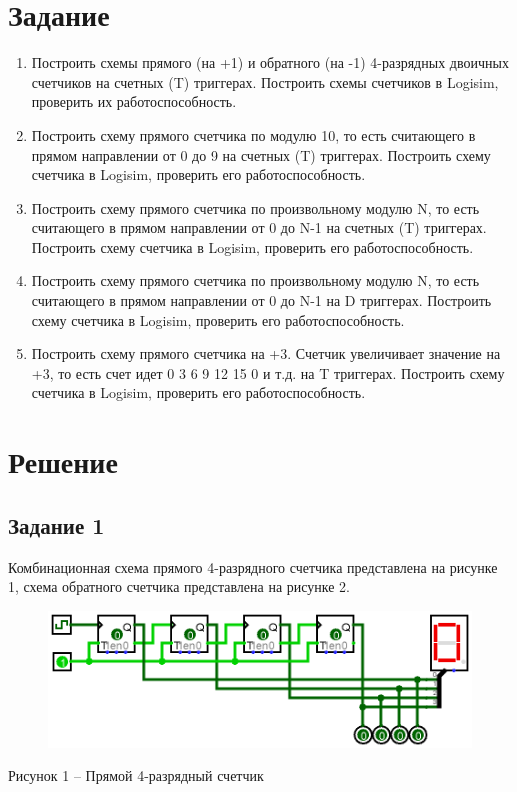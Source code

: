 \documentclass[a4paper,14pt]{extarticle}
\begin{document}
	\section*{Задание}
	\begin{enumerate}
		\item Построить схемы прямого (на +1) и обратного (на -1) 4-разрядных двоичных счетчиков на счетных (T) триггерах. Построить схемы счетчиков в Logisim, проверить их работоспособность.
		
		\item Построить схему прямого счетчика по модулю 10, то есть считающего в прямом направлении от 0 до 9 на счетных (T) триггерах. Построить схему счетчика в Logisim, проверить его работоспособность.
		
		\item Построить схему прямого счетчика по произвольному модулю N, то есть считающего в прямом направлении от 0 до N-1 на счетных (T) триггерах. Построить схему счетчика в Logisim, проверить его работоспособность.
		
		\item Построить схему прямого счетчика по произвольному модулю N, то есть считающего в прямом направлении от 0 до N-1 на D триггерах. Построить схему счетчика в Logisim, проверить его работоспособность.
		
		\item Построить схему прямого счетчика на +3. Счетчик увеличивает значение на +3, то есть счет идет 0 3 6 9 12 15 0 и т.д. на T триггерах. Построить схему счетчика в Logisim, проверить его работоспособность.
	\end{enumerate}
	
	\newpage
	\section*{Решение}
	\subsection*{Задание 1}
	Комбинационная схема прямого 4-разрядного счетчика представлена на рисунке 1, схема обратного счетчика представлена на рисунке 2.
	
	\begin{figure}[h]
		\centering
		\includegraphics[width=0.8\linewidth]{images/s-1-1}
	\end{figure}
	\begin{center}
		Рисунок 1 – Прямой 4-разрядный счетчик
	\end{center}
	
\end{document}
